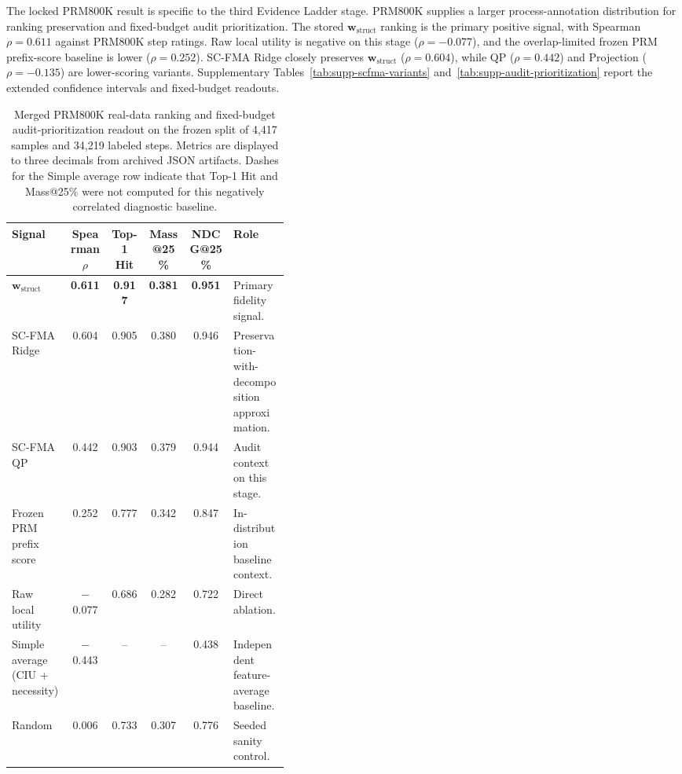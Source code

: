 \documentclass[a4paper,fleqn]{cas-sc}
\newcommand{\wstruct}{\ensuremath{\mathbf{w}_{\mathrm{struct}}}}
\begin{document}
The locked PRM800K result is specific to the third Evidence Ladder stage. PRM800K supplies a larger process-annotation distribution for ranking preservation and fixed-budget audit prioritization. The stored \wstruct{} ranking is the primary positive signal, with Spearman $\rho = 0.611$ against PRM800K step ratings. Raw local utility is negative on this stage ($\rho = -0.077$), and the overlap-limited frozen PRM prefix-score baseline is lower ($\rho = 0.252$). SC-FMA Ridge closely preserves \wstruct{} ($\rho = 0.604$), while QP ($\rho = 0.442$) and Projection ($\rho = -0.135$) are lower-scoring variants. Supplementary Tables~\ref{tab:supp-scfma-variants} and~\ref{tab:supp-audit-prioritization} report the extended confidence intervals and fixed-budget readouts.

\begin{table}[ht]
\caption{Merged PRM800K real-data ranking and fixed-budget audit-prioritization readout on the frozen split of 4,417 samples and 34,219 labeled steps. Metrics are displayed to three decimals from archived JSON artifacts. Dashes for the Simple average row indicate that Top-1 Hit and Mass@25\% were not computed for this negatively correlated diagnostic baseline.}
\label{tab:prm800k-audit}
\centering
\small
\renewcommand{\arraystretch}{1.08}
\begin{tabular}{Z{0.21\linewidth}ccccZ{0.20\linewidth}}
\toprule
\textbf{Signal} & \textbf{Spearman $\rho$} & \textbf{Top-1 Hit} & \textbf{Mass@25\%} & \textbf{NDCG@25\%} & \textbf{Role} \\
\midrule
\wstruct{} & \textbf{0.611} & \textbf{0.917} & \textbf{0.381} & \textbf{0.951} & Primary fidelity signal. \\
SC-FMA Ridge & 0.604 & 0.905 & 0.380 & 0.946 & Preservation-with-decomposition approximation. \\
SC-FMA QP & 0.442 & 0.903 & 0.379 & 0.944 & Audit context on this stage. \\
Frozen PRM prefix score & 0.252 & 0.777 & 0.342 & 0.847 & In-distribution baseline context. \\
Raw local utility & $-$0.077 & 0.686 & 0.282 & 0.722 & Direct ablation. \\
Simple average (CIU + necessity) & $-$0.443 & -- & -- & 0.438 & Independent feature-average baseline. \\
Random & 0.006 & 0.733 & 0.307 & 0.776 & Seeded sanity control. \\
\bottomrule
\end{tabular}
\end{table}
\end{document}
